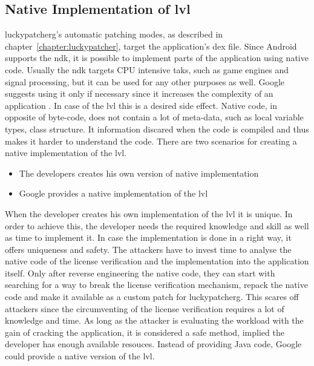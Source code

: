 \subsection{Native Implementation of \gls{lvl}} \label{subsection:counter-modifications-dynamic}

\gls{luckypatcherg}'s automatic patching modes, as described in chapter~\ref{chapter:luckypatcher}, target the application's \gls{dex} file.
Since Android supports the \gls{ndk}, it is possible to implement parts of the application using native code.
\newline
Usually the \gls{ndk} targets CPU intensive taks, such as game engines and signal processing, but it can be used for any other purposes as well.
Google suggests using it only if necessary since it increases the complexity of an application \cite{androidNdk}.
In case of the \gls{lvl} this is a desired side effect.
Native code, in opposite of byte-code, does not contain a lot of meta-data, such as local variable types, class structure.
It information discared when the code is compiled and thus makes it harder to understand the code.
\newline
There are two scenarios for creating a native implementation of the \gls{lvl}.
\begin{itemize}
  \item The developers creates his own version of native implementation
  \item Google provides a native implementation of the \gls{lvl}
\end{itemize}
When the developer creates his own implementation of the \gls{lvl} it is unique.
In order to achieve this, the developer needs the required knowledge and skill as well as time to implement it.
In case the implementation is done in a right way, it offers uniqueness and safety.
The attackers have to invest time to analyse the native code of the license verification and the implementation into the application itself.
Only after reverse engineering the native code, they can start with searching for a way to break the license verification mechanism, repack the native code and make it available as a custom patch for \gls{luckypatcherg}.
This scares off attackers since the circumventing of the license verification requires a lot of knowledge and time.
As long as the attacker is evaluating the workload with the gain of cracking the application, it is considered a safe method, implied the developer has enough available resouces. \cite{munteanLicense}
\newline
Instead of providing Java code, Google could provide a native version of the \gls{lvl}.
